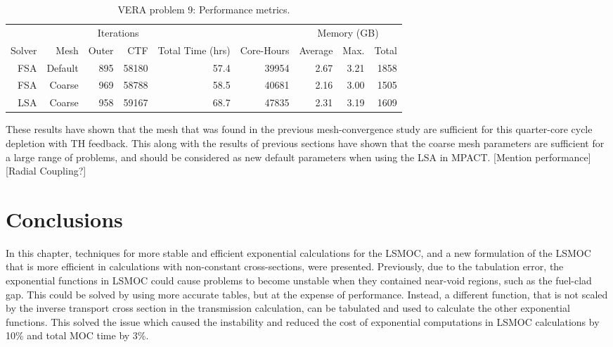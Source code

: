 {{{      \begin{table}[htbp]
        \centering
        \caption{VERA problem 9: Performance metrics.\label{tab:LSMOC:P9:Performance}}
        \begin{tabular}{rrrrrrrrr}\toprule
                 &      & \multicolumn{2}{c}{Iterations} & & & \multicolumn{3}{c}{Memory (GB)}\\\cline{3-4}\cline{7-9}
          Solver & Mesh    & Outer &   CTF & Total Time (hrs) & Core-Hours & Average & Max. & Total\\\midrule
             FSA & Default &   895 & 58180 &            57.4  &      39954 &    2.67 & 3.21 & 1858\\
             FSA &  Coarse &   969 & 58788 &            58.5  &      40681 &    2.16 & 3.00 & 1505\\
             LSA &  Coarse &   958 & 59167 &            68.7  &      47835 &    2.31 & 3.19 & 1609\\\bottomrule
        \end{tabular}
      \end{table}

      These results have shown that the mesh that was found in the previous mesh-convergence study are sufficient for this quarter-core cycle depletion with \ac{TH} feedback.
      This along with the results of previous sections have shown that the coarse mesh parameters are sufficient for a large range of problems, and should be considered as new default parameters when using the \ac{LSA} in MPACT.
      [Mention performance]
      [Radial Coupling?]
    }
  }
  \section{Conclusions}{\label{sec:LSMOC:Conclusions}
    In this chapter, techniques for more stable and efficient exponential calculations for the \ac{LSMOC}, and a new formulation of the \ac{LSMOC} that is more efficient in calculations with non-constant cross-sections, were presented.
    Previously, due to the tabulation error, the exponential functions in \ac{LSMOC} could cause problems to become unstable when they contained near-void regions, such as the fuel-clad gap.
    This could be solved by using more accurate tables, but at the expense of performance.
    Instead, a different function, that is not scaled by the inverse transport cross section in the transmission calculation, can be tabulated and used to calculate the other exponential functions.
    This solved the issue which caused the instability and reduced the cost of exponential computations in \ac{LSMOC} calculations by 10\% and total \ac{MOC} time by 3\%.

}}
